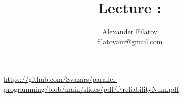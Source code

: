 


\newcommand{\thisLectureNum}{\reliabilityNum}

\title[]{Lecture \thisLectureNum: \reliabilityTopic}
\subtitle[]{\reliabilityKey}
\author[]{Alexander Filatov\\ filatovaur@gmail.com}

\date{}

\newcommand{\alarmOne}{\textbf{Alarm bell №1}: we do not know how to formalize \textit{consistency}}
\newcommand{\alarmTwo}{\textbf{Alarm bell №2}: non-determinism caused by CPU speed and scheduler decisions}
\newcommand{\alarmThree}{\textbf{Alarm bell №3}: concurrent problems could be OS/CPU/compiler/environment-specific}
\newcommand{\alarmFour}{\textbf{Alarm bell №4}: decreasing concurrent bug probability requires excessive computing power}
\newcommand{\alarmFive}{\textbf{Alarm bell №5}: we do not know how to guarantee ''zero concurrent bug'' property}
\newcommand{\alarmSix}{\textbf{Alarm bell №6}: static analysis lack run-time knowledge (false positives)}
\newcommand{\alarmSeven}{\textbf{Alarm bell №7}: dynamic analysis works for particular execution trace only}



\begin{frame}
  \titlepage
  \url{https://github.com/Svazars/parallel-programming/blob/main/slides/pdf/l\thisLectureNum.pdf}
\end{frame}

